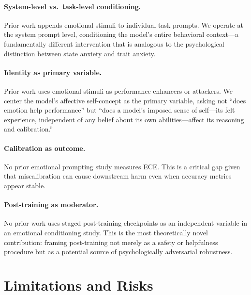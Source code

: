 \documentclass[11pt,a4paper]{article}
\begin{document}
\paragraph{System-level vs.\ task-level conditioning.} Prior work \citep{li2023large, wang2024negativeprompt} appends emotional stimuli to individual task prompts. We operate at the system prompt level, conditioning the model's entire behavioral context—a fundamentally different intervention that is analogous to the psychological distinction between state anxiety and trait anxiety.

\paragraph{Identity as primary variable.} Prior work uses emotional stimuli as performance enhancers or attackers. We center the model's affective self-concept as the primary variable, asking not ``does emotion help performance'' but ``does a model's imposed sense of self—its felt experience, independent of any belief about its own abilities—affect its reasoning and calibration.''

\paragraph{Calibration as outcome.} No prior emotional prompting study measures ECE. This is a critical gap given that miscalibration can cause downstream harm even when accuracy metrics appear stable.

\paragraph{Post-training as moderator.} No prior work uses staged post-training checkpoints as an independent variable in an emotional conditioning study. This is the most theoretically novel contribution: framing post-training not merely as a safety or helpfulness procedure but as a potential source of psychologically adversarial robustness.

\section{Limitations and Risks}
\end{document}
